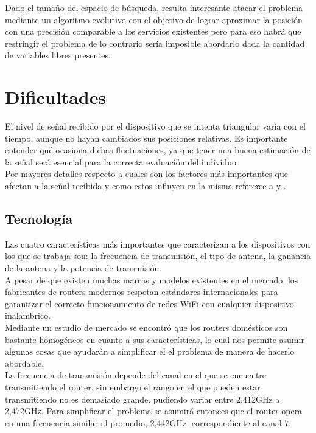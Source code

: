 \documentclass[journal]{IEEEtran}
\begin{document}
Dado el tamaño del espacio de búsqueda, resulta interesante atacar el problema mediante un algoritmo evolutivo con el objetivo de lograr aproximar la posición con una precisión comparable a los servicios existentes pero para eso habrá que restringir el problema de lo contrario sería imposible abordarlo dada la cantidad de variables libres presentes.\\

\section{Dificultades}

El nivel de señal recibido por el dispositivo que se intenta triangular varía con el tiempo, aunque no hayan cambiados sus posiciones relativas. Es importante entender qué ocasiona dichas fluctuaciones, ya que tener una buena estimación de la señal será esencial para la correcta evaluación del individuo.\\

Por mayores detalles respecto a cuales son los factores más importantes que afectan a la señal recibida y como estos influyen en la misma refererse a \cite{fuzzy:logic:based:system} y \cite{radar:tracking:system}.\\

\subsection{Tecnología}

Las cuatro características más importantes que caracterizan a los dispositivos con los que se trabaja son: la frecuencia de transmisión, el tipo de antena, la ganancia de la antena y la potencia de transmisión.\\

A pesar de que existen muchas marcas y modelos existentes en el mercado, los fabricantes de routers modernos respetan estándares internacionales para garantizar el correcto funcionamiento de redes WiFi con cualquier dispositivo inalámbrico.\\

Mediante un estudio de mercado se encontró que los routers domésticos son bastante homogéneos en cuanto a sus características, lo cual nos permite asumir algunas cosas que ayudarán a simplificar el el problema de manera de hacerlo abordable.\\

La frecuencia de transmisión depende del canal en el que se encuentre transmitiendo el router, sin embargo el rango en el que pueden estar transmitiendo no es demasiado grande, pudiendo variar entre 2,412GHz a 2,472GHz. Para simplificar el problema se asumirá entonces que el router opera en una frecuencia similar al promedio, 2,442GHz, correspondiente al canal 7.\\
\end{document}
